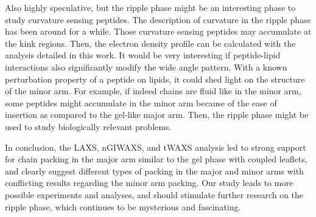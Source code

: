 
Also highly speculative, but the ripple phase might be an interesting phase
to study curvature sensing peptides. The description of curvature in the
ripple phase has been around for a while. Those curvature sensing peptides
may accumulate at the kink regions. Then, the electron density profile
can be calculated with the analysis detailed in this work. It would 
be very interesting if peptide-lipid interactions also significantly 
modify the wide angle pattern. With a known perturbation property of 
a peptide on lipids, it could shed light on the structure of the minor arm.
For example, if indeed chains are fluid like in the minor arm, some peptides
might accumulate in the minor arm because of the ease of 
insertion as compared to the gel-like major arm.
Then, the ripple phase might be used to study biologically relevant problems.

In conclusion, the LAXS, nGIWAXS, and tWAXS analysis led to strong support 
for chain packing in the major arm similar to the gel phase with coupled leaflets,
and clearly suggest different types of packing in the 
major and minor arms with
conflicting results regarding the minor arm packing.
Our study leads to more possible experiments and analyses, and should 
stimulate further research on the ripple phase, which continues to 
be mysterious and fascinating.